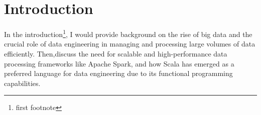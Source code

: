 \chapter*{Introduction}

In the introduction\footnote{first footnote}, I would provide background on the rise of big data and the crucial role of data engineering in managing and processing large volumes of data efficiently. Then,\footnotemark discuss the need for scalable and high-performance data processing frameworks like Apache Spark, and how Scala has emerged as a preferred language for data engineering due to its functional programming capabilities\cite{abelson.etal_1997}.\footnotemark[\value{footnote}]

